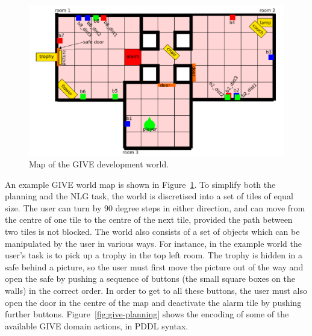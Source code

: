 \documentclass[letterpaper]{article}
\begin{document}
\begin{figure}[t]
\centering
\includegraphics[width=0.75\columnwidth]{give_world_2}
\caption{Map of the GIVE development world.}
  \label{fig:give-development-world}
\end{figure}

An example GIVE world map is shown in
Figure~\ref{fig:give-development-world}. To simplify both the planning and
the NLG task, the world is discretised into a set of tiles of equal size.
The user can turn by 90 degree steps in either direction, and can move from
the centre of one tile to the centre of the next tile, provided the path
between two tiles is not blocked. The world also consists of a set of
objects which can be manipulated by the user in various ways. For
instance, in the example world the user's task is to pick up a trophy in
the top left room. The trophy is hidden in a safe behind a picture, so the
user must first move the picture out of the way and open the safe by
pushing a sequence of buttons (the small square boxes on the walls) in the
correct order. In order to get to all these buttons, the user must also
open the door in the centre of the map and deactivate the alarm tile by
pushing further buttons. Figure~\ref{fig:give-planning} shows the encoding
of some of the available GIVE domain actions, in PDDL syntax.
\end{document}
